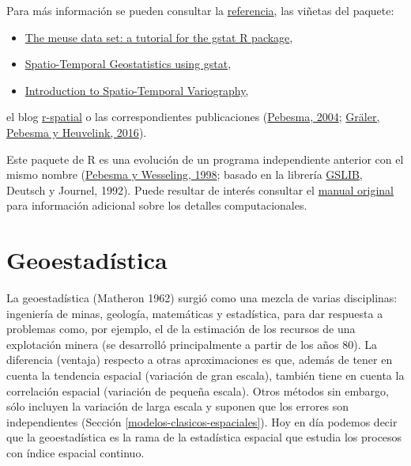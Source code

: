 \documentclass[
]{book}
\providecommand{\tightlist}{%
  \setlength{\itemsep}{0pt}\setlength{\parskip}{0pt}}
\theoremstyle{break}
\theoremstyle{definition}
\theoremstyle{definition}
\theoremstyle{definition}
\theoremstyle{definition}
\theoremstyle{remark}
\begin{document}
Para más información se pueden consultar la \href{https://r-spatial.github.io/gstat/reference/index.html}{referencia}, las viñetas del paquete:

\begin{itemize}
\tightlist
\item
  \href{https://cran.r-project.org/web/packages/gstat/vignettes/gstat.pdf}{The meuse data set: a tutorial for the gstat R package},
\item
  \href{https://cran.r-project.org/web/packages/gstat/vignettes/spatio-temporal-kriging.pdf}{Spatio-Temporal Geostatistics using gstat},
\item
  \href{https://cran.r-project.org/web/packages/gstat/vignettes/st.pdf}{Introduction to Spatio-Temporal Variography},
\end{itemize}

el blog \href{https://r-spatial.org/}{r-spatial} o las correspondientes publicaciones (\href{http://www.sciencedirect.com/science/article/pii/S0098300404000676}{Pebesma, 2004}; \href{https://journal.r-project.org/archive/2016-1/na-pebesma-heuvelink.pdf}{Gräler, Pebesma y Heuvelink, 2016}).

Este paquete de R es una evolución de un programa independiente anterior con el mismo nombre (\href{http://www.sciencedirect.com/science/article/pii/S0098300497000824}{Pebesma y Wesseling, 1998}; basado en la librería \href{http://www.gslib.com}{GSLIB}, Deutsch y Journel, 1992).
Puede resultar de interés consultar el \href{http://www.gstat.org/gstat.pdf}{manual original} para información adicional sobre los detalles computacionales.

\section{Geoestadística}\label{geoestadistica}

La geoestadística (Matheron 1962) surgió como una mezcla de varias disciplinas: ingeniería de minas, geología, matemáticas y estadística, para dar respuesta a problemas como, por ejemplo, el de la estimación de los recursos de una explotación minera (se desarrolló principalmente a partir de los años 80).
La diferencia (ventaja) respecto a otras aproximaciones es que, además de tener en cuenta la tendencia espacial (variación de gran escala), también tiene en cuenta la correlación espacial (variación de pequeña escala).
Otros métodos sin embargo, sólo incluyen la variación de larga escala y suponen que los errores son independientes (Sección \ref{modelos-clasicos-espaciales}).
Hoy en día podemos decir que la geoestadística es la rama de la estadística espacial que estudia los procesos con índice espacial continuo.
\end{document}
